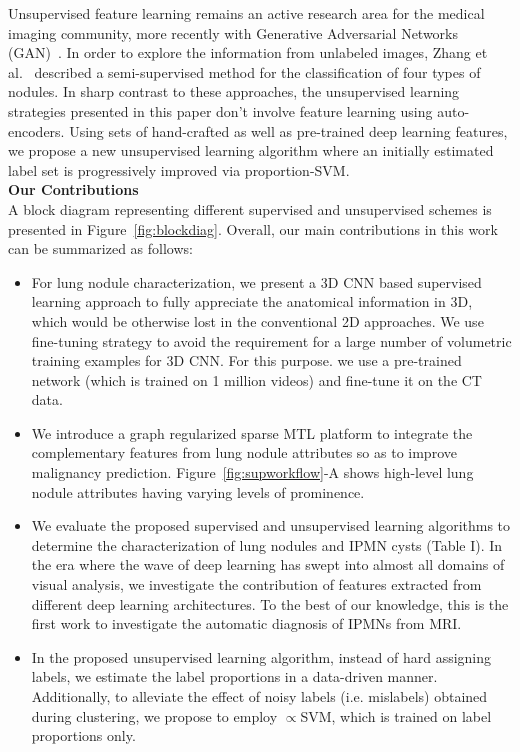 \documentclass[journal]{IEEEtran}
\begin{document}
Unsupervised feature learning remains an active research area for the medical imaging community, more recently with Generative Adversarial Networks (GAN)~\cite{radford2015unsupervised}. In order to explore the information from unlabeled images, Zhang et al.~\cite{zhang2014ranking} described a semi-supervised method for the classification of four types of nodules. In sharp contrast to these approaches, the unsupervised learning strategies presented in this paper don't involve feature learning using auto-encoders. Using sets of hand-crafted as well as pre-trained deep learning features, we propose a new unsupervised learning algorithm where an initially estimated label set is progressively improved via proportion-SVM.\\

\noindent \textbf{Our Contributions}\\
\noindent A block diagram representing different supervised and unsupervised schemes is presented in Figure~\ref{fig:blockdiag}. Overall, our main contributions in this work can be summarized as follows:

\begin{itemize}[topsep=1em,leftmargin=*]
\itemsep1em 
\item For lung nodule characterization, we present a 3D CNN based supervised learning approach to fully appreciate the anatomical information in 3D, which would be otherwise lost in the conventional 2D approaches. We use fine-tuning strategy to avoid the requirement for a large number of volumetric training examples for 3D CNN. For this purpose. we use a pre-trained network (which is trained on 1 million videos) and fine-tune it on the CT data. 

\item We introduce a graph regularized sparse MTL platform to integrate the complementary features from lung nodule attributes so as to improve malignancy prediction. Figure~\ref{fig:supworkflow}-A shows high-level lung nodule attributes having varying levels of prominence. 

\item We evaluate the proposed supervised and unsupervised learning algorithms to determine the characterization of lung nodules and IPMN cysts (Table I). In the era where the wave of deep learning has swept into almost all domains of visual analysis, we investigate the contribution of features extracted from different deep learning architectures. To the best of our knowledge, this is the first work to investigate the automatic diagnosis of IPMNs from MRI.

\item In the proposed unsupervised learning algorithm, instead of hard assigning labels, we estimate the label proportions in a data-driven manner. Additionally, to alleviate the effect of noisy labels (i.e. mislabels) obtained during clustering, we propose to employ $\propto$SVM, which is trained on label proportions only.
\end{itemize}
\end{document}
